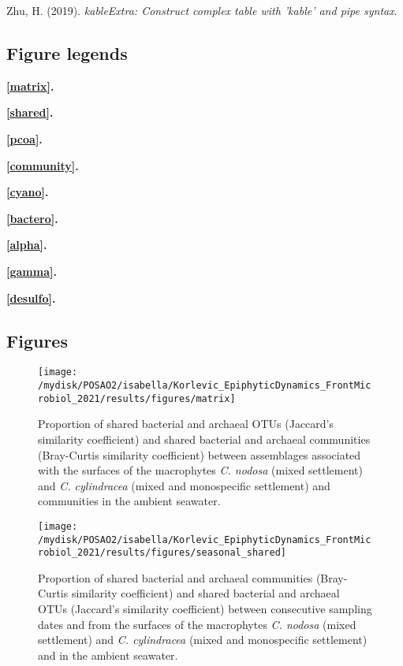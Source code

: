\documentclass[
  12pt,
]{article}
\begin{document}
\leavevmode\hypertarget{ref-Zhu2019}{}%
Zhu, H. (2019). \emph{kableExtra: Construct complex table with 'kable'
and pipe syntax}.

\newpage 
\setlength\parindent{0pt}

\hypertarget{figure-legends}{%
\subsection{Figure legends}\label{figure-legends}}

\textbf{\autoref{matrix}.} 

\textbf{\autoref{shared}.} 

\textbf{\autoref{pcoa}.} 

\textbf{\autoref{community}.} 

\textbf{\autoref{cyano}.} 

\textbf{\autoref{bactero}.} 

\textbf{\autoref{alpha}.} 

\textbf{\autoref{gamma}.} 

\textbf{\autoref{desulfo}.} 

\hypertarget{figures}{%
\subsection{Figures}\label{figures}}

\begin{figure}[H]

{\centering \texttt{[image: /mydisk/POSAO2/isabella/Korlevic\_EpiphyticDynamics\_FrontMicrobiol\_2021/results/figures/matrix]} 

}

\caption{Proportion of shared bacterial and archaeal OTUs (Jaccard's similarity coefficient) and shared bacterial and archaeal communities (Bray-Curtis similarity coefficient) between assemblages associated with the surfaces of the macrophytes \textit{C. nodosa} (mixed settlement) and \textit{C. cylindracea} (mixed and monospecific settlement) and communities in the ambient seawater.\label{matrix}}\label{fig:unnamed-chunk-1}
\end{figure}

\begin{figure}[H]

{\centering \texttt{[image: /mydisk/POSAO2/isabella/Korlevic\_EpiphyticDynamics\_FrontMicrobiol\_2021/results/figures/seasonal\_shared]} 

}

\caption{Proportion of shared bacterial and archaeal communities (Bray-Curtis similarity coefficient) and shared bacterial and archaeal OTUs (Jaccard's similarity coefficient) between consecutive sampling dates and from the surfaces of the macrophytes \textit{C. nodosa} (mixed settlement) and \textit{C. cylindracea} (mixed and monospecific settlement) and in the ambient seawater.\label{shared}}\label{fig:unnamed-chunk-2}
\end{figure}
\end{document}

